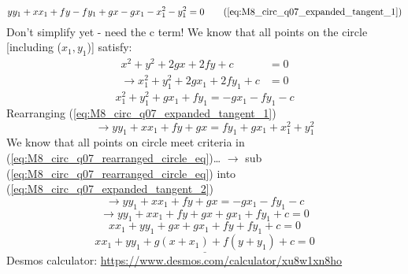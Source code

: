 \begin{solution}
\begin{equation}
		y y_{1} 
		+ 
		x x_{1}  
		+ fy - fy_{1}
		+ gx - gx_{1} 
		- x_{1}^{2}
		- y_{1}^{2} 
		= 0 
		\tag{\ref{eq:M8_circ_q07_expanded_tangent_1}}
	\end{equation}
	Don't simplify yet - need the c term!
	\newline
	We know that all points on the circle [including ($x_{1},y_{1}$)] satisfy:
	\begin{align*}
		x^{2} + y^{2} + 2gx + 2fy + c 
			&= 0
			\\
		\rightarrow
			x_{1}^{2} + y_{1}^{2} + 2gx_{1} + 2fy_{1} + c 
			&= 0
	\end{align*}
	\begin{equation}
		x_{1}^{2} + y_{1}^{2} + gx_{1} + fy_{1} 
		=
		-gx_{1} -fy_{1} - c
		\label{eq:M8_circ_q07_rearranged_circle_eq}
	\end{equation}
	Rearranging (\ref{eq:M8_circ_q07_expanded_tangent_1})
	\begin{equation}
		\rightarrow
		y y_{1} + x x_{1} + fy + gx 
		=
		fy_{1} + gx_{1} + x_{1}^{2} + y_{1}^{2}
		\label{eq:M8_circ_q07_expanded_tangent_2}
	\end{equation}
	We know that all points on circle meet criteria in 
	(\ref{eq:M8_circ_q07_rearranged_circle_eq})\dots
	\newline
	$\rightarrow$ sub (\ref{eq:M8_circ_q07_rearranged_circle_eq})
	into (\ref{eq:M8_circ_q07_expanded_tangent_2})
	\[
		\rightarrow
		y y_{1} + x x_{1} + fy + gx 
		=
		-gx_{1} -fy_{1} - c
	\]
	\[
		\rightarrow
		y y_{1} 
		+ 
		x x_{1} 
		+ 
		fy 
		+ 
		gx
		+
		gx_{1}
		+ 
		fy_{1} 
		+
		c 
		= 0
	\]
	\[
		x x_{1} + y y_{1} 
		+ gx + gx_{1}
		+ fy + fy_{1} 
		+ c 
		= 0
	\]
	\[
		\underline{
			x x_{1} + y y_{1} 
			+ g(x + x_{1})
			+ f(y + y_{1})
			+ c 
			= 0
		}
	\]
	Desmos calculator:
	\url{https://www.desmos.com/calculator/xu8w1xn8ho} 
\end{solution}

